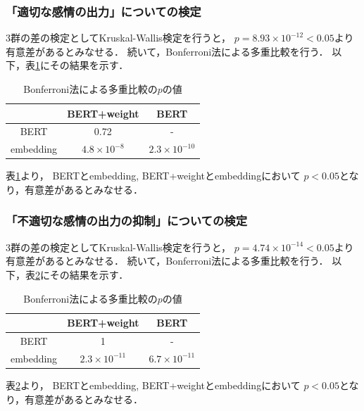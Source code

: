 	\subsubsection{「適切な感情の出力」についての検定}
		3群の差の検定としてKruskal-Wallis検定を行うと，
		$p=8.93\times10^{-12}<0.05$より有意差があるとみなせる．
		続いて，Bonferroni法による多重比較を行う．
		以下，表\ref{table:jikken2_good_Bonferroni}にその結果を示す．
		\begin{table}[H]
			\centering
			\caption{Bonferroni法による多重比較の$p$の値}
			\label{table:jikken2_good_Bonferroni}
			\begin{tabular}{|c|c|c|}
				\hline
				& BERT+weight & BERT \\
				\hline
				BERT & 0.72 & - \\
				\hline
				embedding & $4.8\times10^{-8}$ & $2.3\times10^{-10}$ \\
				\hline
			\end{tabular}
		\end{table}
		表\ref{table:jikken2_good_Bonferroni}より，
		BERTとembedding, BERT+weightとembeddingにおいて
		$p<0.05$となり，有意差があるとみなせる．
	\subsubsection{「不適切な感情の出力の抑制」についての検定}
		3群の差の検定としてKruskal-Wallis検定を行うと，
		$p=4.74\times10^{-14}<0.05$より有意差があるとみなせる．
		続いて，Bonferroni法による多重比較を行う．
		以下，表\ref{table:jikken2_bad_Bonferroni}にその結果を示す．
		\begin{table}[H]
			\centering
			\caption{Bonferroni法による多重比較の$p$の値}
			\label{table:jikken2_bad_Bonferroni}
			\begin{tabular}{|c|c|c|}
				\hline
				& BERT+weight & BERT \\
				\hline
				BERT & 1 & - \\
				\hline
				embedding & $2.3\times10^{-11}$ & $6.7\times10^{-11}$ \\
				\hline
			\end{tabular}
		\end{table}
		表\ref{table:jikken2_bad_Bonferroni}より，
		BERTとembedding, BERT+weightとembeddingにおいて
		$p<0.05$となり，有意差があるとみなせる．
